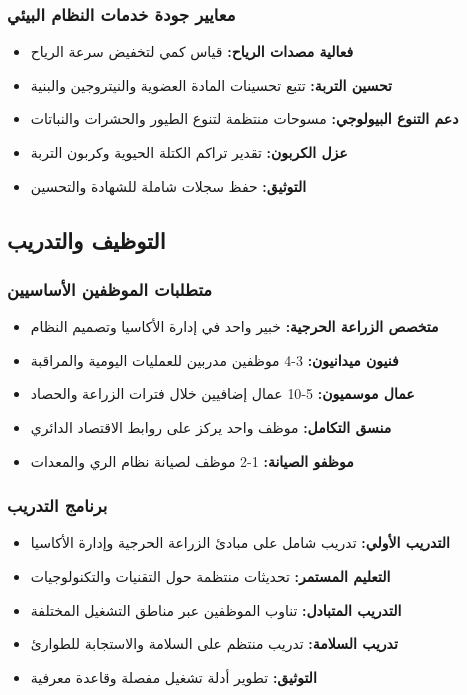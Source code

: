 \subsubsection{معايير جودة خدمات النظام البيئي}
\begin{itemize}
    \item \textbf{فعالية مصدات الرياح:} قياس كمي لتخفيض سرعة الرياح
    \item \textbf{تحسين التربة:} تتبع تحسينات المادة العضوية والنيتروجين والبنية
    \item \textbf{دعم التنوع البيولوجي:} مسوحات منتظمة لتنوع الطيور والحشرات والنباتات
    \item \textbf{عزل الكربون:} تقدير تراكم الكتلة الحيوية وكربون التربة
    \item \textbf{التوثيق:} حفظ سجلات شاملة للشهادة والتحسين
\end{itemize}

\subsection{التوظيف والتدريب}

\subsubsection{متطلبات الموظفين الأساسيين}
\begin{itemize}
    \item \textbf{متخصص الزراعة الحرجية:} خبير واحد في إدارة الأكاسيا وتصميم النظام
    \item \textbf{فنيون ميدانيون:} 3-4 موظفين مدربين للعمليات اليومية والمراقبة
    \item \textbf{عمال موسميون:} 5-10 عمال إضافيين خلال فترات الزراعة والحصاد
    \item \textbf{منسق التكامل:} موظف واحد يركز على روابط الاقتصاد الدائري
    \item \textbf{موظفو الصيانة:} 1-2 موظف لصيانة نظام الري والمعدات
\end{itemize}

\subsubsection{برنامج التدريب}
\begin{itemize}
    \item \textbf{التدريب الأولي:} تدريب شامل على مبادئ الزراعة الحرجية وإدارة الأكاسيا
    \item \textbf{التعليم المستمر:} تحديثات منتظمة حول التقنيات والتكنولوجيات
    \item \textbf{التدريب المتبادل:} تناوب الموظفين عبر مناطق التشغيل المختلفة
    \item \textbf{تدريب السلامة:} تدريب منتظم على السلامة والاستجابة للطوارئ
    \item \textbf{التوثيق:} تطوير أدلة تشغيل مفصلة وقاعدة معرفية
\end{itemize}
